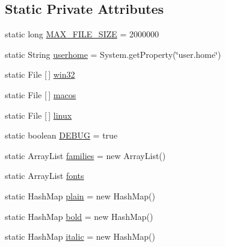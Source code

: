 \subsection*{Static Private Attributes}
\begin{DoxyCompactItemize}
\item 
static long \mbox{\hyperlink{classorg_1_1newdawn_1_1slick_1_1tools_1_1hiero_1_1truetype_1_1_font_data_a35896aef6b3483a95e0b8e4ef5a5140f}{M\+A\+X\+\_\+\+F\+I\+L\+E\+\_\+\+S\+I\+ZE}} = 2000000
\item 
static String \mbox{\hyperlink{classorg_1_1newdawn_1_1slick_1_1tools_1_1hiero_1_1truetype_1_1_font_data_af0be3d061e554e3951a5cb44c2a693c5}{userhome}} = System.\+get\+Property(\char`\"{}user.\+home\char`\"{})
\item 
static File \mbox{[}$\,$\mbox{]} \mbox{\hyperlink{classorg_1_1newdawn_1_1slick_1_1tools_1_1hiero_1_1truetype_1_1_font_data_a9d19076a9b7a25ec820091f2b12885f2}{win32}}
\item 
static File \mbox{[}$\,$\mbox{]} \mbox{\hyperlink{classorg_1_1newdawn_1_1slick_1_1tools_1_1hiero_1_1truetype_1_1_font_data_aae4244999a0630249091efaeb9f6a71f}{macos}}
\item 
static File \mbox{[}$\,$\mbox{]} \mbox{\hyperlink{classorg_1_1newdawn_1_1slick_1_1tools_1_1hiero_1_1truetype_1_1_font_data_a9d0148dcfb0682c2a34fddc5e2d640ec}{linux}}
\item 
static boolean \mbox{\hyperlink{classorg_1_1newdawn_1_1slick_1_1tools_1_1hiero_1_1truetype_1_1_font_data_a643b0f56f9565700837fee0d82a1f280}{D\+E\+B\+UG}} = true
\item 
static Array\+List \mbox{\hyperlink{classorg_1_1newdawn_1_1slick_1_1tools_1_1hiero_1_1truetype_1_1_font_data_a713c024899c48f71c123f2559bdd8ede}{families}} = new Array\+List()
\item 
static Array\+List \mbox{\hyperlink{classorg_1_1newdawn_1_1slick_1_1tools_1_1hiero_1_1truetype_1_1_font_data_af5a135e5f654e01a6d82aa58a37d8b24}{fonts}}
\item 
static Hash\+Map \mbox{\hyperlink{classorg_1_1newdawn_1_1slick_1_1tools_1_1hiero_1_1truetype_1_1_font_data_af00cfaf27e50e7d9254460d9584311f4}{plain}} = new Hash\+Map()
\item 
static Hash\+Map \mbox{\hyperlink{classorg_1_1newdawn_1_1slick_1_1tools_1_1hiero_1_1truetype_1_1_font_data_a2249de026f17fb99d5f8e971df67a2ea}{bold}} = new Hash\+Map()
\item 
static Hash\+Map \mbox{\hyperlink{classorg_1_1newdawn_1_1slick_1_1tools_1_1hiero_1_1truetype_1_1_font_data_a2ef9fd6b5308c94238907b9a0a796842}{italic}} = new Hash\+Map()

\end{DoxyCompactItemize}
